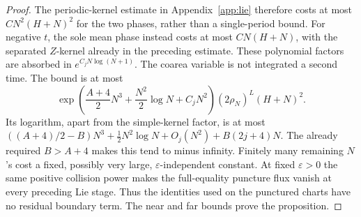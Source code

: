 \documentclass[11pt]{article}
\numberwithin{equation}{section}
\theoremstyle{definition}
\newcommand{\eps}{\varepsilon}
\begin{document}
\begin{proof}
The periodic-kernel estimate in Appendix~\ref{app:lie} therefore
costs at most \(CN^2(H+N)^2\) for the two phases, rather than a
single-period bound. For negative \(t\), the sole mean phase
instead costs at most \(CN(H+N)\), with the separated \(Z\)-kernel
already in the preceding estimate. These polynomial factors are
absorbed in \(e^{C_jN\log(N+1)}\). The coarea variable is not
integrated a second time. The bound is at most
\[
 \exp\left(\frac{A+4}{2}N^3+\frac{N^2}{2}\log N+C_jN^2\right)
 (2\rho_N)^L(H+N)^2.
\]
Its logarithm, apart from the simple-kernel factor, is at most
\(((A+4)/2-B)N^3+\tfrac12N^2\log N+O_j(N^2)+B(2j+4)N\).
The already required \(B>A+4\) makes this tend to minus infinity.
Finitely many remaining \(N\)'s cost a fixed, possibly very large,
\(\eps\)-independent constant.
At fixed \(\eps>0\) the same positive collision power makes the
full-equality puncture flux vanish at every preceding Lie stage.
Thus the identities used on the punctured charts have no residual
boundary term. The near and far bounds prove the proposition.
\end{proof}



\end{document}
